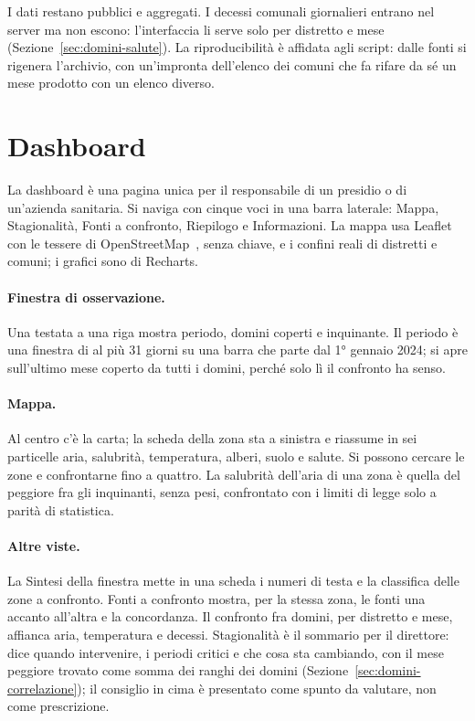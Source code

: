 I dati restano pubblici e aggregati. I decessi comunali giornalieri entrano nel server ma non escono: l'interfaccia li serve solo per distretto e mese (Sezione~\ref{sec:domini-salute}). La riproducibilità è affidata agli script: dalle fonti si rigenera l'archivio, con un'impronta dell'elenco dei comuni che fa rifare da sé un mese prodotto con un elenco diverso.

\section{Dashboard}
\label{sec:impl-dashboard}

La dashboard è una pagina unica per il responsabile di un presidio o di un'azienda sanitaria. Si naviga con cinque voci in una barra laterale: Mappa, Stagionalità, Fonti a confronto, Riepilogo e Informazioni. La mappa usa Leaflet con le tessere di OpenStreetMap~\cite{osm_copyright}, senza chiave, e i confini reali di distretti e comuni; i grafici sono di Recharts.

\paragraph{Finestra di osservazione.} Una testata a una riga mostra periodo, domini coperti e inquinante. Il periodo è una finestra di al più 31 giorni su una barra che parte dal 1° gennaio 2024; si apre sull'ultimo mese coperto da tutti i domini, perché solo lì il confronto ha senso.

\paragraph{Mappa.} Al centro c'è la carta; la scheda della zona sta a sinistra e riassume in sei particelle aria, salubrità, temperatura, alberi, suolo e salute. Si possono cercare le zone e confrontarne fino a quattro. La salubrità dell'aria di una zona è quella del peggiore fra gli inquinanti, senza pesi, confrontato con i limiti di legge solo a parità di statistica.

\paragraph{Altre viste.} La Sintesi della finestra mette in una scheda i numeri di testa e la classifica delle zone a confronto. Fonti a confronto mostra, per la stessa zona, le fonti una accanto all'altra e la concordanza. Il confronto fra domini, per distretto e mese, affianca aria, temperatura e decessi. Stagionalità è il sommario per il direttore: dice quando intervenire, i periodi critici e che cosa sta cambiando, con il mese peggiore trovato come somma dei ranghi dei domini (Sezione~\ref{sec:domini-correlazione}); il consiglio in cima è presentato come spunto da valutare, non come prescrizione.

